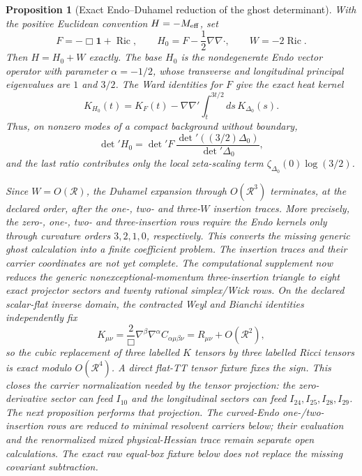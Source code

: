 \documentclass[11pt]{article}
\newtheorem{proposition}[theorem]{Proposition}
\theoremstyle{definition}
\theoremstyle{remark}
\begin{document}
\begin{proposition}[Exact Endo--Duhamel reduction of the ghost determinant]
With the positive Euclidean convention $H=-M_{\rm eff}$, set
\[
 F=-\Box\mathbf1+\operatorname{Ric},\qquad
 H_0=F-\frac12\nabla\nabla\!\cdot,\qquad
 W=-2\operatorname{Ric}.
\]
Then $H=H_0+W$ exactly.  The base $H_0$ is the nondegenerate Endo vector
operator with parameter $\alpha=-1/2$, whose transverse and longitudinal
principal eigenvalues are $1$ and $3/2$.  The Ward identities for $F$ give
the exact heat kernel~\cite{BarvinskyNonminimal}
\[
 K_{H_0}(t)=K_F(t)-\nabla\nabla'
 \int_t^{3t/2}ds\,K_{\Delta_0}(s).
\]
Thus, on nonzero modes of a compact background without boundary,
\[
 \det{}'H_0=\det{}'F\,
 \frac{\det{}'((3/2)\Delta_0)}{\det{}'\Delta_0},
\]
and the last ratio contributes only the local zeta-scaling term
$\zeta_{\Delta_0}(0)\log(3/2)$.

Since $W=O(\mathcal R)$, the Duhamel expansion through
$O(\mathcal R^3)$ terminates, at the declared order, after the one-, two- and
three-$W$ insertion traces.  More precisely, the zero-, one-, two- and
three-insertion rows require the Endo kernels only through curvature orders
$3,2,1,0$, respectively.  This converts the missing generic ghost
calculation into a finite coefficient problem.  The insertion traces and
their carrier coordinates are not yet complete.  The computational supplement
now reduces the generic nonexceptional-momentum three-insertion triangle to
eight exact projector sectors and twenty rational simplex/Wick rows.  On the
declared scalar-flat inverse domain, the contracted Weyl and Bianchi
identities independently fix
\[
 K_{\mu\nu}=\frac{2}{\Box}\nabla^\beta\nabla^\alpha
 C_{\alpha\mu\beta\nu}=R_{\mu\nu}+O(\mathcal R^2),
\]
so the cubic replacement of three labelled $K$ tensors by three labelled
Ricci tensors is exact modulo $O(\mathcal R^4)$.  A direct flat-TT tensor
fixture fixes the sign.  This closes the carrier normalization needed by the
tensor projection: the zero-derivative sector can feed $I_{10}$ and the
longitudinal sectors can feed $I_{24},I_{25},I_{28},I_{29}$.  The next
proposition performs that projection.  The curved-Endo one-/two-insertion
rows are reduced to minimal resolvent carriers below; their evaluation and
the renormalized mixed physical-Hessian trace remain separate open
calculations.  The exact raw equal-box fixture below does not replace the
missing covariant subtraction.
\end{proposition}
\end{document}
